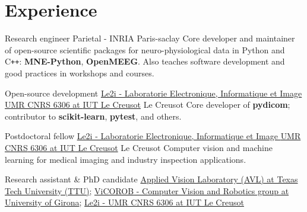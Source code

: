 
\section{Experience}

{Research engineer}
{Parietal - INRIA}
{}
{Paris-saclay}
{
  Core developer and maintainer of open-source scientific packages for neuro-physiological
  data in Python and C\texttt{++}: \textbf{MNE-Python}, \textbf{OpenMEEG}.
  \newline
  Also teaches software development and good practices in workshops and courses.
}


{Open-source development}
{
  \href{http://le2i.cnrs.fr/?lang=en}{Le2i - Laboratorie Electronique,
    Informatique et Image {UMR CNRS} 6306 at {IUT} Le Creusot}
}
{}
{Le Creusot}
{
  Core developer of \textbf{pydicom}; contributor to \textbf{scikit-learn}, \textbf{pytest},
  and others.
}

{Postdoctoral fellow}
{
  \href{http://le2i.cnrs.fr/?lang=en}{Le2i - Laboratorie Electronique,
    Informatique et Image {UMR CNRS} 6306 at {IUT} Le Creusot}
}
{}
{Le Creusot}
{
  Computer vision and machine learning for medical imaging and industry
  inspection applications.
}

{}
{Research assistant \& PhD candidate}
{
  \newline
  \href{http://www.depts.ttu.edu/ece/groups/appliedvision/}{Applied Vision
    Laboratory (AVL) at Texas Tech University (TTU)};
  \newline
  \href{http://vicorob.udg.edu}{{ViCOROB} - Computer Vision and Robotics group at {U}niversity of {G}irona};
  \newline
  \href{http://le2i.cnrs.fr/?lang=en}{Le2i - {UMR CNRS} 6306 at {IUT} Le Creusot}
}
{}
{}
{
}

